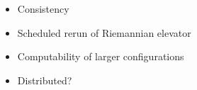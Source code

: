 \begin{itemize}
    \item Consistency
    \item Scheduled rerun of Riemannian elevator
    \item Computability of larger configurations
    \item Distributed? 
\end{itemize}